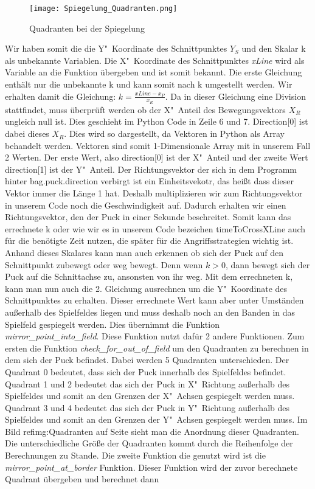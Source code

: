 \begin{wrapfigure}{R}{0pt}
	\vspace{-15pt}
	\texttt{[image: Spiegelung\_Quadranten.png]}
	\vspace{-15pt}
	\caption{Quadranten bei der Spiegelung}
	\vspace{-15pt}
	\label{img:Quadranten}
\end{wrapfigure}

Wir haben somit die die Y"~Koordinate des Schnittpunktes $Y_S$ und den Skalar k als unbekannte Variablen. Die X"~Koordinate des Schnittpunktes \textit{xLine} wird als Variable an die Funktion übergeben und ist somit bekannt. Die erste Gleichung enthält nur die unbekannte k und kann somit nach k umgestellt werden. Wir erhalten damit die Gleichung: 
$k = \frac{xLine - x_P}{x_R}$.
Da in dieser Gleichung eine Division stattfindet, muss überprüft werden ob der X"~Anteil des Bewegungsvektors $X_R$ ungleich null ist. Dies geschieht im Python Code in Zeile 6 und 7. Direction[0] ist dabei dieses $X_R$. Dies wird so dargestellt, da Vektoren in Python als Array behandelt werden. Vektoren sind somit 1-Dimensionale Array mit in unserem Fall 2 Werten. Der erste Wert, also direction[0] ist der X"~Anteil und der zweite Wert direction[1] ist der Y"~Anteil. Der Richtungsvektor der sich in dem Programm hinter bag.puck.direction verbirgt ist ein Einheitsvekotr, das heißt dass dieser Vektor immer die Länge 1 hat. Deshalb multiplizieren wir zum Richtungsvektor in unserem Code noch die Geschwindigkeit auf. Dadurch erhalten wir einen Richtungsvektor, den der Puck in einer Sekunde beschreitet. Somit kann das errechnete k oder wie wir es in unserem Code bezeichen timeToCrossXLine auch für die benötigte Zeit nutzen, die später für die Angriffsstrategien wichtig ist. Anhand dieses Skalares kann man auch erkennen ob sich der Puck auf den Schnittpunkt zubewegt oder weg bewegt. Denn wenn $k>0$, dann bewegt sich der Puck auf die Schnittachse zu, ansonsten von ihr weg. Mit dem errechneten k, kann man nun auch die 2. Gleichung ausrechnen um die Y"~Koordinate des Schnittpunktes zu erhalten. Dieser errechnete Wert kann aber unter Umständen außerhalb des Spielfeldes liegen und muss deshalb noch an den Banden in das Spielfeld gespiegelt werden. Dies übernimmt die Funktion \textit{mirror\_point\_into\_field}. Diese Funktion nutzt dafür 2 andere Funktionen. Zum ersten die Funktion \textit{check\_for\_out\_of\_field} um den Quadranten zu berechnen in dem sich der Puck befindet. Dabei werden 5 Quadranten unterschieden. Der Quadrant 0 bedeutet, dass sich der Puck innerhalb des Spielfeldes befindet. Quadrant 1 und 2 bedeutet das sich der Puck in X"~Richtung außerhalb des Spielfeldes und somit an den Grenzen der X"~Achsen gespiegelt werden muss. Quadrant 3 und 4 bedeutet das sich der Puck in Y"~Richtung außerhalb des Spielfeldes und somit an den Grenzen der Y"~Achsen gespiegelt werden muss. Im Bild ref{img:Quadranten} auf Seite \pageref{img:Quadranten} sieht man die Anordnung dieser Quadranten. Die unterschiedliche Größe der Quadranten kommt durch die Reihenfolge der Berechnungen zu Stande. Die zweite Funktion die genutzt wird ist die \textit{mirror\_point\_at\_border} Funktion. Dieser Funktion wird der zuvor berechnete Quadrant übergeben und berechnet dann 